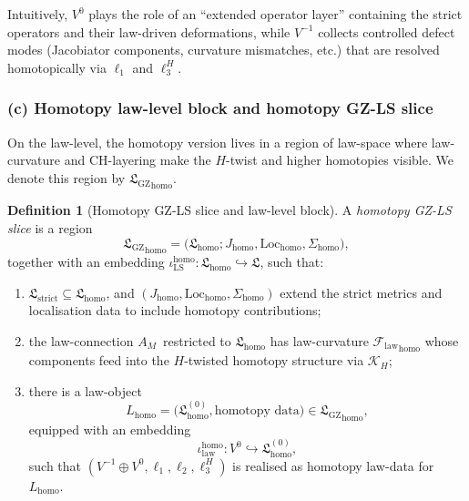 \documentclass[11pt]{book}
\theoremstyle{plain}
\theoremstyle{definition}
\newtheorem{definition}[theorem]{Definition} \theoremstyle{remark}
\newcommand{\GZLS}{\ensuremath{\mathfrak{L}_{\mathrm{GZ}}}}       \newcommand{\GZLT}{\ensuremath{M_{!w}}}                           \newcommand{\GZLOC}{\ensuremath{A_M}}                             \newcommand{\GZLCurv}{\ensuremath{\mathcal{F}_{\mathrm{law}}}}
\begin{document}
Intuitively, $V^0$ plays the role of an “extended operator layer”
containing the strict operators and their law-driven deformations,
while $V^{-1}$ collects controlled defect modes (Jacobiator components,
curvature mismatches, etc.) that are resolved homotopically via
$\ell_1$ and $\ell_3^H$.



\subsubsection*{(c) Homotopy law-level block and homotopy GZ-LS slice}

On the law-level, the homotopy version lives in a region of law-space
where law-curvature and CH-layering make the $H$-twist and higher
homotopies visible. We denote this region by ${\GZLS}_{\mathrm{homo}}$.

\begin{definition}[Homotopy GZ-LS slice and law-level block]
A \emph{homotopy GZ-LS slice} is a region
  \[
     {\GZLS}_{\mathrm{homo}}
     =
     \bigl(
       \mathfrak{L}_{\mathrm{homo}};
       J_{\mathrm{homo}},
       \mathrm{Loc}_{\mathrm{homo}},
       \Sigma_{\mathrm{homo}}
     \bigr),
  \]
  together with an embedding
  \(
     \iota_{\mathrm{LS}}^{\mathrm{homo}}:
     \mathfrak{L}_{\mathrm{homo}}\hookrightarrow\mathfrak{L}
  \),
  such that:
  \begin{enumerate}[label=\roman*)]
    \item $\mathfrak{L}_{\mathrm{strict}}\subseteq\mathfrak{L}_{\mathrm{homo}}$,
          and $(J_{\mathrm{homo}},\mathrm{Loc}_{\mathrm{homo}},
          \Sigma_{\mathrm{homo}})$ extend the strict metrics and
          localisation data to include homotopy contributions;
    \item the law-connection \GZLOC\ restricted to
          $\mathfrak{L}_{\mathrm{homo}}$ has law-curvature
          ${\GZLCurv}_{\mathrm{homo}}$ whose components feed into the
          $H$-twisted homotopy structure via $\mathcal{K}_H$;
    \item there is a law-object
          \[
             L_{\mathrm{homo}}
             =
             \bigl(
               \mathfrak{L}_{\mathrm{homo}}^{(0)},
               \text{homotopy data}
             \bigr)
             \in{\GZLS}_{\mathrm{homo}},
          \]
          equipped with an embedding
          \[
             \iota_{\mathrm{law}}^{\mathrm{homo}}:
               V^0\hookrightarrow\mathfrak{L}_{\mathrm{homo}}^{(0)},
          \]
          such that $(V^{-1}\oplus V^0,\ell_1,\ell_2,\ell_3^H)$ is
          realised as homotopy law-data for $L_{\mathrm{homo}}$.
  \end{enumerate}
\end{definition}
\end{document}
